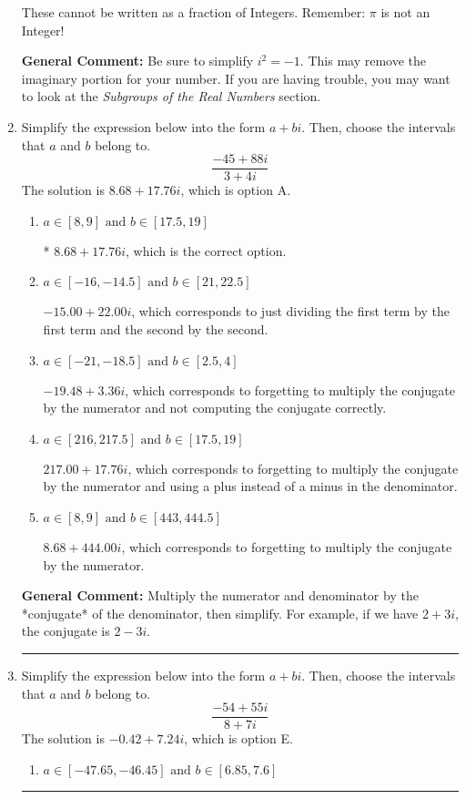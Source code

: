 \documentclass{extbook}[14pt]
\newcommand{\litem}[1]{\item #1

\rule{\textwidth}{0.4pt}}
\begin{document}
\begin{enumerate}
{\begin{enumerate}[label=\Alph*.]
These cannot be written as a fraction of Integers. Remember: $\pi$ is not an Integer!
\end{enumerate}

\textbf{General Comment:} Be sure to simplify $i^2 = -1$. This may remove the imaginary portion for your number. If you are having trouble, you may want to look at the \textit{Subgroups of the Real Numbers} section.
}
\litem{
Simplify the expression below into the form $a+bi$. Then, choose the intervals that $a$ and $b$ belong to.
\[ \frac{-45 + 88 i}{3 + 4 i} \]
The solution is \( 8.68  + 17.76 i \), which is option A.\begin{enumerate}[label=\Alph*.]
\item \( a \in [8, 9] \text{ and } b \in [17.5, 19] \)

* $8.68  + 17.76 i$, which is the correct option.
\item \( a \in [-16, -14.5] \text{ and } b \in [21, 22.5] \)

 $-15.00  + 22.00 i$, which corresponds to just dividing the first term by the first term and the second by the second.
\item \( a \in [-21, -18.5] \text{ and } b \in [2.5, 4] \)

 $-19.48  + 3.36 i$, which corresponds to forgetting to multiply the conjugate by the numerator and not computing the conjugate correctly.
\item \( a \in [216, 217.5] \text{ and } b \in [17.5, 19] \)

 $217.00  + 17.76 i$, which corresponds to forgetting to multiply the conjugate by the numerator and using a plus instead of a minus in the denominator.
\item \( a \in [8, 9] \text{ and } b \in [443, 444.5] \)

 $8.68  + 444.00 i$, which corresponds to forgetting to multiply the conjugate by the numerator.
\end{enumerate}

\textbf{General Comment:} Multiply the numerator and denominator by the *conjugate* of the denominator, then simplify. For example, if we have $2+3i$, the conjugate is $2-3i$.
}
\litem{
Simplify the expression below into the form $a+bi$. Then, choose the intervals that $a$ and $b$ belong to.
\[ \frac{-54 + 55 i}{8 + 7 i} \]
The solution is \( -0.42  + 7.24 i \), which is option E.\begin{enumerate}[label=\Alph*.]
\item \( a \in [-47.65, -46.45] \text{ and } b \in [6.85, 7.6] \)


\end{enumerate}}
\end{enumerate}
\end{document}
